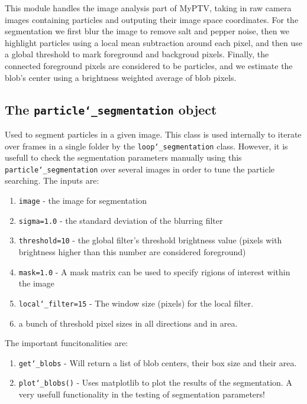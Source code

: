 \documentclass[10pt,a4paper]{article}
\begin{document}
This module handles the image analysis part of MyPTV, taking in raw camera images containing particles and outputing their image space coordinates. For the segmentation we first blur the image to remove salt and pepper noise, then we highlight particles using a local mean subtraction around each pixel, and then use a global threshold to mark foreground and backgroud pixels. Finally, the connected foreground pixels are considered to be particles, and we estimate the blob's center using a brightness weighted average of blob pixels.



\subsection{The \texttt{particle\char`_segmentation} object} 

Used to segment particles in a given image. This class is used internally to iterate over frames in a single folder by the \texttt{loop\char`_segmentation} class. However, it is usefull to check the segmentation parameters manually using this \texttt{particle\char`_segmentation} over several images in order to tune the particle searching. The inputs are:
%
\begin{enumerate}
	\item \texttt{image} - the image for segmentation
	\item \texttt{sigma=1.0} - the standard deviation of the blurring filter
	\item \texttt{threshold=10} - the global filter's threshold brightness value (pixels with brightness higher than this number are considered foreground) 
	\item \texttt{mask=1.0} - A mask matrix can be used to specify rigions of interest within the image
	\item \texttt{local\char`_filter=15} - The window size (pixels) for the local filter.
	\item a bunch of threshold pixel sizes in all directions and in area.
\end{enumerate}


The important funcitonalities are:
%
\begin{enumerate}
	\item \texttt{get\char`_blobs} - Will return a list of blob centers, their box size and their area.
	\item \texttt{plot\char`_blobs()} - Uses matplotlib to plot the results of the segmentation. A very usefull functionality in the testing of segmentation parameters!
\end{enumerate}
\end{document}
